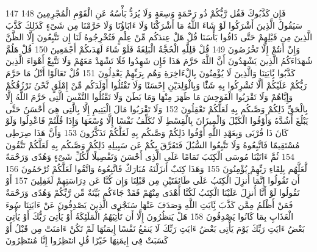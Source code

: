{\tiny\colorbox{cl_aya}{147}} فَإِن كَذَّبُوكَ فَقُل رَّبُّكُمْ ذُو رَحْمَةٍ وَسِعَةٍ وَلَا يُرَدُّ بَأْسُهُ عَنِ الْقَوْمِ الْمُجْرِمِينَ
{\tiny\colorbox{cl_aya}{148}} سَيَقُولُ الَّذِينَ أَشْرَكُوا لَوْ شَاءَ اللَّهُ مَا أَشْرَكْنَا وَلَا ءَابَاؤُنَا وَلَا حَرَّمْنَا مِن شَىْءٍ كَذَلِكَ كَذَّبَ الَّذِينَ مِن قَبْلِهِمْ حَتَّى ذَاقُوا بَأْسَنَا قُلْ هَلْ عِندَكُم مِّنْ عِلْمٍ فَتُخْرِجُوهُ لَنَا إِن تَتَّبِعُونَ إِلَّا الظَّنَّ وَإِنْ أَنتُمْ إِلَّا تَخْرُصُونَ
{\tiny\colorbox{cl_aya}{149}} قُلْ فَلِلَّهِ الْحُجَّةُ الْبَلِغَةُ فَلَوْ شَاءَ لَهَدَىكُمْ أَجْمَعِينَ
{\tiny\colorbox{cl_aya}{150}} قُلْ هَلُمَّ شُهَدَاءَكُمُ الَّذِينَ يَشْهَدُونَ أَنَّ اللَّهَ حَرَّمَ هَذَا فَإِن شَهِدُوا فَلَا تَشْهَدْ مَعَهُمْ وَلَا تَتَّبِعْ أَهْوَاءَ الَّذِينَ كَذَّبُوا بَِٔايَتِنَا وَالَّذِينَ لَا يُؤْمِنُونَ بِالْءَاخِرَةِ وَهُم بِرَبِّهِمْ يَعْدِلُونَ
{\tiny\colorbox{cl_aya}{151}} قُلْ تَعَالَوْا أَتْلُ مَا حَرَّمَ رَبُّكُمْ عَلَيْكُمْ أَلَّا تُشْرِكُوا بِهِ شَئًْا وَبِالْوَلِدَيْنِ إِحْسَنًا وَلَا تَقْتُلُوا أَوْلَدَكُم مِّنْ إِمْلَقٍ نَّحْنُ نَرْزُقُكُمْ وَإِيَّاهُمْ وَلَا تَقْرَبُوا الْفَوَحِشَ مَا ظَهَرَ مِنْهَا وَمَا بَطَنَ وَلَا تَقْتُلُوا النَّفْسَ الَّتِى حَرَّمَ اللَّهُ إِلَّا بِالْحَقِّ ذَلِكُمْ وَصَّىكُم بِهِ لَعَلَّكُمْ تَعْقِلُونَ
{\tiny\colorbox{cl_aya}{152}} وَلَا تَقْرَبُوا مَالَ الْيَتِيمِ إِلَّا بِالَّتِى هِىَ أَحْسَنُ حَتَّى يَبْلُغَ أَشُدَّهُ وَأَوْفُوا الْكَيْلَ وَالْمِيزَانَ بِالْقِسْطِ لَا نُكَلِّفُ نَفْسًا إِلَّا وُسْعَهَا وَإِذَا قُلْتُمْ فَاعْدِلُوا وَلَوْ كَانَ ذَا قُرْبَى وَبِعَهْدِ اللَّهِ أَوْفُوا ذَلِكُمْ وَصَّىكُم بِهِ لَعَلَّكُمْ تَذَكَّرُونَ
{\tiny\colorbox{cl_aya}{153}} وَأَنَّ هَذَا صِرَطِى مُسْتَقِيمًا فَاتَّبِعُوهُ وَلَا تَتَّبِعُوا السُّبُلَ فَتَفَرَّقَ بِكُمْ عَن سَبِيلِهِ ذَلِكُمْ وَصَّىكُم بِهِ لَعَلَّكُمْ تَتَّقُونَ
{\tiny\colorbox{cl_aya}{154}} ثُمَّ ءَاتَيْنَا مُوسَى الْكِتَبَ تَمَامًا عَلَى الَّذِى أَحْسَنَ وَتَفْصِيلًا لِّكُلِّ شَىْءٍ وَهُدًى وَرَحْمَةً لَّعَلَّهُم بِلِقَاءِ رَبِّهِمْ يُؤْمِنُونَ
{\tiny\colorbox{cl_aya}{155}} وَهَذَا كِتَبٌ أَنزَلْنَهُ مُبَارَكٌ فَاتَّبِعُوهُ وَاتَّقُوا لَعَلَّكُمْ تُرْحَمُونَ
{\tiny\colorbox{cl_aya}{156}} أَن تَقُولُوا إِنَّمَا أُنزِلَ الْكِتَبُ عَلَى طَائِفَتَيْنِ مِن قَبْلِنَا وَإِن كُنَّا عَن دِرَاسَتِهِمْ لَغَفِلِينَ
{\tiny\colorbox{cl_aya}{157}} أَوْ تَقُولُوا لَوْ أَنَّا أُنزِلَ عَلَيْنَا الْكِتَبُ لَكُنَّا أَهْدَى مِنْهُمْ فَقَدْ جَاءَكُم بَيِّنَةٌ مِّن رَّبِّكُمْ وَهُدًى وَرَحْمَةٌ فَمَنْ أَظْلَمُ مِمَّن كَذَّبَ بَِٔايَتِ اللَّهِ وَصَدَفَ عَنْهَا سَنَجْزِى الَّذِينَ يَصْدِفُونَ عَنْ ءَايَتِنَا سُوءَ الْعَذَابِ بِمَا كَانُوا يَصْدِفُونَ
{\tiny\colorbox{cl_aya}{158}} هَلْ يَنظُرُونَ إِلَّا أَن تَأْتِيَهُمُ الْمَلَئِكَةُ أَوْ يَأْتِىَ رَبُّكَ أَوْ يَأْتِىَ بَعْضُ ءَايَتِ رَبِّكَ يَوْمَ يَأْتِى بَعْضُ ءَايَتِ رَبِّكَ لَا يَنفَعُ نَفْسًا إِيمَنُهَا لَمْ تَكُنْ ءَامَنَتْ مِن قَبْلُ أَوْ كَسَبَتْ فِى إِيمَنِهَا خَيْرًا قُلِ انتَظِرُوا إِنَّا مُنتَظِرُونَ
